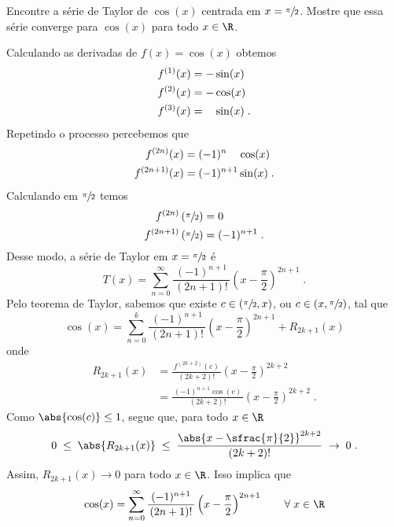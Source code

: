 \begin{example}
  Encontre a série de Taylor de $\cos(x)$ centrada em $x=\sfrac{\pi}{2}$.
  Mostre que essa série converge para $\cos(x)$ para todo $x\in\R$.

  \solution
  Calculando as derivadas de $f(x) =\cos(x)$ obtemos
  \begin{align*}
    f^{(1)}(x) & =           -  \sin(x) \\
    f^{(2)}(x) & =           -  \cos(x) \\
    f^{(3)}(x) & = \hphantom{-} \sin(x) \;.
  \end{align*}
  Repetindo o processo percebemos que
  \begin{align*}
  	f^{(2n)}(x)   & =(-1)^{n}\hphantom{^{+1}} \cos(x)   \\
  	f^{(2n+1)}(x) & =(-1)^{n+1}               \sin(x)   \;.
  \end{align*}
  Calculando em $\sfrac{\pi}{2}$ temos
  \begin{align*}
     f^{(2n)}   & \left( \sfrac{\pi}{2} \right) = 0          \\
     f^{(2n+1)} & \left( \sfrac{\pi}{2} \right) = (-1)^{n+1} \;.
  \end{align*}
  Desse modo, a série de Taylor em $x=\sfrac{\pi}{2}$ é
  \[
    T(x) = \sum_{n=0}^\infty \frac{(-1)^{n+1}}{\,(2n+1)!\,}
    \left( x-\frac{\pi}{2} \right)^{2n+1}    \;.
  \]
  Pelo teorema de Taylor, sabemos que existe
  \(c \in \left(\sfrac{\pi}{2}, x \right)\), ou
  \(c \in \left(x, \sfrac{\pi}{2} \right)\), tal que
  \[
    \cos(x) = \sum_{n=0}^k \frac{(-1)^{n+1}}{\,(2n+1)!\,}
    \left(x-\frac{\pi}{2} \right)^{2n+1}
    + R_{2k+1}(x)
  \]
  onde
  \begin{align*}
   	R_{2k+1}(x) & =\frac{\, f^{(2k+2)}(c)     \,}{ (2k+2)! } \left( x - \frac{\pi}{2} \right)^{2k+2}  \\[3mm]
  	            & =\frac{\, (-1)^{n+1}\cos(c) \,}{ (2k+2)! } \left( x - \frac{\pi}{2} \right)^{2k+2}  \;.
  \end{align*}
  Como
  $\abs{\cos(c)} \leq 1$,
  segue que, para todo  $x\in \R$
  \[
    0 \;\leq\; \abs{R_{2k+1}(x)}
      \;\leq\; \frac{ \abs{x-\sfrac{\pi}{2}}^{2k+2} }{ (2k+2)! }
      \;\rightarrow\; 0   \;.
  \]
  Assim, $R_{2k+1}(x)\rightarrow 0$ para todo $x\in \R$. Isso implica que
  \[
    \cos(x) = \sum_{n=0}^\infty \frac{ (-1)^{n+1} }{\, (2n+1)! \,}
                                \left( x - \frac{\pi}{2} \right)^{2n+1}
    \qquad \forall\; x\in\R
  \]
\end{example}

